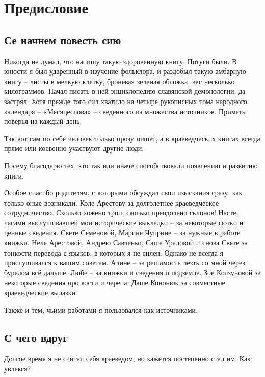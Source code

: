 \chapter*{Предисловие}

\section*{Се начнем повесть сию} 

Никогда не думал, что напишу такую здоровенную книгу. Потуги были. В юности я был ударенный в изучение фольклора, и раздобыл такую амбарную книгу – листы в мелкую клетку, броневая зеленая обложка, вес несколько килограммов. Начал писать в ней энциклопедию славянской демонологии, да застрял. Хотя прежде того сил хватило на четыре рукописных тома народного календаря – «Месяцеслова» – сведенного из множества источников. Приметы, поверья на каждый день.

Так вот сам по себе человек только прозу пишет, а в краеведческих книгах всегда прямо или косвенно участвуют другие люди.

Посему благодарю тех, кто так или иначе способствовали появлению и развитию книги.

Особое спасибо родителям, с которыми обсуждал свои изыскания сразу, как только оные возникали. Коле Арестову за долголетнее краеведческое сотрудничество. Сколько хожено троп, сколько преодолено склонов! Насте, часами выслушивавшей мои исторические выкладки – за некоторые фотки и ценные сведения. Свете Семеновой, Марине Чуприне – за нужные в работе книжки. Неле Арестовой, Андрею Савченко, Саше Ураловой и снова Свете за тонкости перевода с языков, в которых я не силен. Однако не всегда я прислушивался к вашим советам. Алине – за решимость лезть со мной через бурелом всё дальше. Любе – за книжки и сведения о подземле. Зое Колзуновой за некоторые сведения про кости и черепа. Даше Кононюк за совместные краеведческие вылазки.

Также и тем, чьими работами я пользовался как источниками.

\section*{С чего вдруг}

Долгое время я не считал себя краеведом, но кажется постепенно стал им. Как увлекся?


